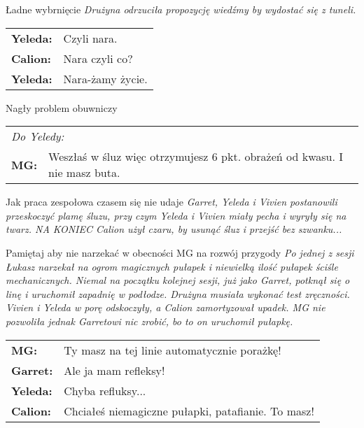 \documentclass[10pt,twoside,twocolumn]{book}
\begin{document}
\begin{rpg-quotebox}{Ładne wybrnięcie}
   \textit{Drużyna odrzuciła propozycję wiedźmy by wydostać się z tuneli.}\\
   
   \begin{tabularx}{\columnwidth}{lX}
      \textbf{Yeleda:} & Czyli nara.\\
      \textbf{Calion:} & Nara czyli co?\\
      \textbf{Yeleda:} & Nara-żamy życie.\\
   \end{tabularx}
\end{rpg-quotebox}


\begin{rpg-quotebox}{Nagły problem obuwniczy}
   \begin{tabularx}{\columnwidth}{lX}
      \multicolumn{2}{l}{\textit{Do Yeledy:}}\\
      
      \textbf{MG:} & Weszłaś w śluz więc otrzymujesz 6 pkt. obrażeń od kwasu. I nie masz buta.\\
   \end{tabularx}
\end{rpg-quotebox}


\begin{rpg-quotebox}{Jak praca zespołowa czasem się nie udaje}
   \textit{Garret, Yeleda i Vivien postanowili przeskoczyć plamę śluzu, przy czym Yeleda i Vivien miały pecha i wyryły się na twarz. NA KONIEC Calion użył czaru, by usunąć śluz i przejść bez szwanku...}
\end{rpg-quotebox}


\begin{rpg-quotebox}{Pamiętaj aby nie narzekać w obecności MG na rozwój przygody}
   \textit{Po jednej z sesji Łukasz narzekał na ogrom magicznych pułapek i niewielką ilość pułapek ściśle mechanicznych. Niemal na początku kolejnej sesji, już jako Garret, potknął się o linę i uruchomił zapadnię w podłodze. Drużyna musiała wykonać test zręczności. Vivien i Yeleda w porę odskoczyły, a Calion zamortyzował upadek. MG nie pozwoliła jednak Garretowi nic zrobić, bo to on uruchomił pułapkę.}\\
   \newline
   \begin{tabularx}{\columnwidth}{lX}
      \textbf{MG:} & Ty masz na tej linie automatycznie porażkę!\\
      \textbf{Garret:} & Ale ja mam refleksy!\\
      \textbf{Yeleda:} & Chyba refluksy...\\
      \textbf{Calion:} & Chciałeś niemagiczne pułapki, patafianie. To masz!\\
   \end{tabularx}
\end{rpg-quotebox}
\end{document}
